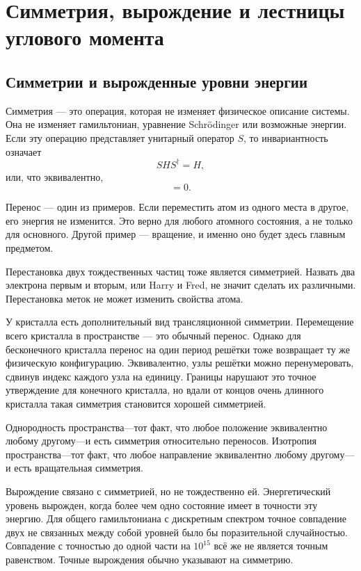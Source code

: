 \chapter{Симметрия, вырождение и лестницы углового момента}
\providecommand{\ket}[1]{\left\lvert#1\right\rangle}

\section{Симметрии и вырожденные уровни энергии}

Симметрия — это операция, которая не изменяет физическое описание системы. Она не изменяет гамильтониан, уравнение Schr\"odinger или возможные энергии. Если эту операцию представляет унитарный оператор \(S\), то инвариантность означает
\begin{equation}
S H S^\dagger=H,
\end{equation}
или, что эквивалентно,
\begin{equation}
[S,H]=0.
\end{equation}

Перенос — один из примеров. Если переместить атом из одного места в другое, его энергия не изменится. Это верно для любого атомного состояния, а не только для основного. Другой пример — вращение, и именно оно будет здесь главным предметом.

Перестановка двух тождественных частиц тоже является симметрией. Назвать два электрона первым и вторым, или Harry и Fred, не значит сделать их различными. Перестановка меток не может изменить свойства атома.

У кристалла есть дополнительный вид трансляционной симметрии. Перемещение всего кристалла в пространстве — это обычный перенос. Однако для бесконечного кристалла перенос на один период решётки тоже возвращает ту же физическую конфигурацию. Эквивалентно, узлы решётки можно перенумеровать, сдвинув индекс каждого узла на единицу. Границы нарушают это точное утверждение для конечного кристалла, но вдали от концов очень длинного кристалла такая симметрия становится хорошей симметрией.

Однородность пространства---тот факт, что любое положение эквивалентно любому другому---и есть симметрия относительно переносов. Изотропия пространства---тот факт, что любое направление эквивалентно любому другому---и есть вращательная симметрия.

Вырождение связано с симметрией, но не тождественно ей. Энергетический уровень вырожден, когда более чем одно состояние имеет в точности эту энергию. Для общего гамильтониана с дискретным спектром точное совпадение двух не связанных между собой уровней было бы поразительной случайностью. Совпадение с точностью до одной части на \(10^{15}\) всё же не является точным равенством. Точные вырождения обычно указывают на симметрию.

